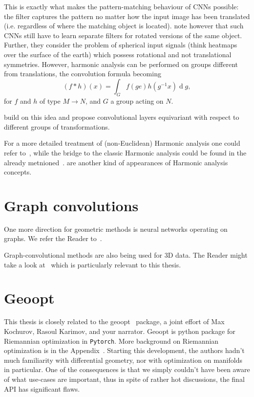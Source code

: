 This is exactly what makes the pattern-matching behaviour of CNNs possible: the
filter captures the pattern no matter how the input image has been translated
(i.e. regardless of where the matching object is located). \citet{s2cnn} note
however that such CNNs still have to learn separate filters for rotated
versions of the same object. Further, they consider the problem of spherical
input signals (think heatmaps over the surface of the earth) which possess
rotational and not translational symmetries. However, harmonic analysis can be
performed on groups different from translations, the convolution
formula becoming
\[
(f * h)(x) = \int_G f(g e) h(g^{-1}x) \operatorname{d}g,
\]
for \( f \) and \( h \) of type \( M\to N \), and \( G \) a group acting on
\( N \).

\citet{s2cnn,cohen2018general,e2cnn} build on this idea and propose
convolutional layers equivariant with respect to different groups of
transformations.

For a more detailed treatment of (non-Euclidean) Harmonic analysis one could
refer
to~\citet{axlerHarmonic,
elliott2019generalized,
explorationsHarmonic,
benedettoHarmonic,
stollharmonic,
terrasHarmonicSymmetric,
terrasHarmonicSymmetric2,
fourierS2},
while the bridge to the classic Harmonic analysis could be found in the already
metnioned~\cite{feichtingerFAHA}.
\citet{eyeRotations,zhou2019glosh,scnnNiessner} are another kind of appearances
of Harmonic analysis concepts.

\section{Graph convolutions}

One more direction for geometric methods is neural networks operating on graphs.
We refer the Reader to~\citet{kipf}.

Graph-convolutional methods are also being used for 3D data. The Reader might
take a look at~\citet{edgeconv} which is particularly relevant to this thesis.

\section{Geoopt} \label{sec:geoopt}

This thesis is closely related to the geoopt~\cite{geoopt} package, a joint
effort of Max Kochurov, Rasoul Karimov, and your narrator.
Geoopt is python package for Riemannian optimization in \texttt{Pytorch}.
More background on Riemannian optimization is in the Appendix~.
Starting this development, the authors hadn't much familiarity with
differential geometry, nor with optimization on manifolds in particular. One of
the consequences is that we simply couldn't have been aware of what use-cases
are important, thus in spite of rather hot discussions, the final API has
significant flaws.


